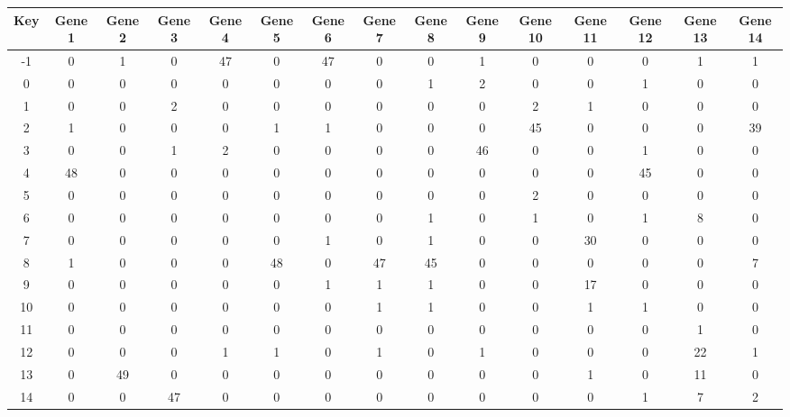 \begin{tabular}{|c|c|c|c|c|c|c|c|c|c|c|c|c|c|c|}
\hline
Key & Gene 1 & Gene 2 & Gene 3 & Gene 4 & Gene 5 & Gene 6 & Gene 7 & Gene 8 & Gene 9 & Gene 10 & Gene 11 & Gene 12 & Gene 13 & Gene 14 \\
\hline
-1 & 0 & 1 & 0 & 47 & 0 & 47 & 0 & 0 & 1 & 0 & 0 & 0 & 1 & 1 \\
0 & 0 & 0 & 0 & 0 & 0 & 0 & 0 & 1 & 2 & 0 & 0 & 1 & 0 & 0 \\
1 & 0 & 0 & 2 & 0 & 0 & 0 & 0 & 0 & 0 & 2 & 1 & 0 & 0 & 0 \\
2 & 1 & 0 & 0 & 0 & 1 & 1 & 0 & 0 & 0 & 45 & 0 & 0 & 0 & 39 \\
3 & 0 & 0 & 1 & 2 & 0 & 0 & 0 & 0 & 46 & 0 & 0 & 1 & 0 & 0 \\
4 & 48 & 0 & 0 & 0 & 0 & 0 & 0 & 0 & 0 & 0 & 0 & 45 & 0 & 0 \\
5 & 0 & 0 & 0 & 0 & 0 & 0 & 0 & 0 & 0 & 2 & 0 & 0 & 0 & 0 \\
6 & 0 & 0 & 0 & 0 & 0 & 0 & 0 & 1 & 0 & 1 & 0 & 1 & 8 & 0 \\
7 & 0 & 0 & 0 & 0 & 0 & 1 & 0 & 1 & 0 & 0 & 30 & 0 & 0 & 0 \\
8 & 1 & 0 & 0 & 0 & 48 & 0 & 47 & 45 & 0 & 0 & 0 & 0 & 0 & 7 \\
9 & 0 & 0 & 0 & 0 & 0 & 1 & 1 & 1 & 0 & 0 & 17 & 0 & 0 & 0 \\
10 & 0 & 0 & 0 & 0 & 0 & 0 & 1 & 1 & 0 & 0 & 1 & 1 & 0 & 0 \\
11 & 0 & 0 & 0 & 0 & 0 & 0 & 0 & 0 & 0 & 0 & 0 & 0 & 1 & 0 \\
12 & 0 & 0 & 0 & 1 & 1 & 0 & 1 & 0 & 1 & 0 & 0 & 0 & 22 & 1 \\
13 & 0 & 49 & 0 & 0 & 0 & 0 & 0 & 0 & 0 & 0 & 1 & 0 & 11 & 0 \\
14 & 0 & 0 & 47 & 0 & 0 & 0 & 0 & 0 & 0 & 0 & 0 & 1 & 7 & 2 \\
\hline
\end{tabular}